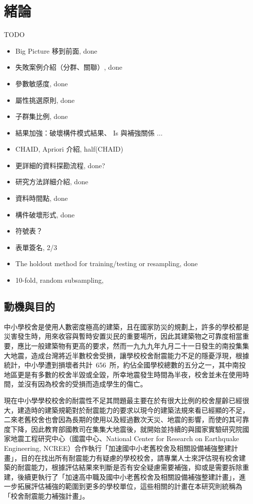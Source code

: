 % 
\chapter{緒論}
\label{cha:intro} 

TODO

\begin{itemize}
\item Big Picture 移到前面, done
\item 失敗案例介紹（分群、關聯）, done
\item 參數敏感度, done
\item 屬性挑選原則, done
\item 子群集比例, done
\item 結果加強：破壞構件模式結果、 Is 與補強關係 ...
\item CHAID, Apriori 介紹, half(CHAID)
\item 更詳細的資料探勘流程, done?
\item 研究方法詳細介紹, done
\item 資料時間點, done
\item 構件破壞形式, done
\item 符號表？
\item 表單簽名, 2/3
\item The holdout method for training/testing or resampling, done
\item 10-fold, random subsampling, %
\end{itemize}

\section{動機與目的}

中小學校舍是使用人數密度極高的建築，且在國家防災的規劃上，許多的學校都是災害發生時，用來收容與暫時安置災民的重要場所，因此其建築物之可靠度相當重要，應比一般建築物有更高的要求，然而一九九九年九月二十一日發生的南投集集大地震，造成台灣將近半數校舍受損，讓學校校舍耐震能力不足的隱憂浮現，根據統計，中小學遭到損壞者共計~656~所，約佔全國學校總數的五分之一，其中南投地區更是有多數的校舍半毀或全毀，所幸地震發生時間為半夜，校舍並未在使用時間，並沒有因為校舍的受損而造成學生的傷亡。

現在中小學學校校舍的耐震性不足其問題最主要在於有很大比例的校舍屋齡已經很大，建造時的建築規範對於耐震能力的要求以現今的建築法規來看已經顯的不足，二來老舊校舍也會因為長期的使用以及經過數次天災、地震的影響，而使的其可靠度下降，因此教育部國教司在集集大地震後，就開始並持續的與國家實驗研究院國家地震工程研究中心（國震中心、National Center for Research on Earthquake Engineering, NCREE）合作執行「加速國中小老舊校舍及相關設備補強整建計畫」，目的在找出所有耐震能力有疑慮的學校校舍，請專業人士來評估現有校舍建築的耐震能力，根據評估結果來判斷是否有安全疑慮需要補強，抑或是需要拆除重建，後續更執行了「加速高中職及國中小老舊校舍及相關設備補強整建計畫」，進一步拓展評估補強的範圍到更多的學校單位，這些相關的計畫在本研究則統稱為「校舍耐震能力補強計畫」。

